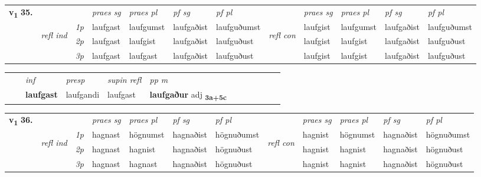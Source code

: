 \begin{tabular}{llllllllllll} \toprule
\multirow{4}{*}{{{\textbf{v{\textsubscript{1}}} \Large{\textbf{35.}}}}}  & &   &  \textit{praes sg}  & \textit{praes pl}  &\textit{pf sg} & \textit{pf pl} &  &  \textit{praes sg}  & \textit{praes pl}  & \textit{pf sg} & \textit{pf pl } \\*
	\cmidrule{4-7} \cmidrule{9-12}
 &\multirow{3}{*}{\begin{turn}{90}\textit{refl ind}\end{turn}} & {\textit{1p}} & laufgast & laufgumst    & laufgaðist & laufguðumst & \multirow{3}{*}{\begin{turn}{90}\textit{refl con}\end{turn}}  &laufgist & laufgumst & laufgaðist & laufguðumst\\*
 &&  {\textit{2p}} &  laufgast  & laufgist   & laufgaðist & laufguðust & &laufgist & laufgist & laufgaðist & laufguðust \\*
& &  {\textit{3p}} & laufgast & laufgast   & laufgaðist & laufguðust & & laufgist & laufgist& laufgaðist & laufguðust  \\*
\cmidrule{4-7} \cmidrule{9-12}
\end{tabular}


\begin{tabular}{llllllllllll}
 & & \textit{inf}     & \textit{presp}  & \textit{supin refl} & \textit{pp m}     \\*
  & & \textbf{laufgast}      & laufgandi  & laufgast & \textbf{laufgaður} adj \textbf{\textsubscript{3a+5c}} \\*
\cmidrule{1-12}
\end{tabular}



\begin{tabular}{llllllllllll} \toprule
\multirow{4}{*}{{{\textbf{v{\textsubscript{1}}} \Large{\textbf{36.}}}}}  & &   &  \textit{praes sg}  & \textit{praes pl}  &\textit{pf sg} & \textit{pf pl} &  &  \textit{praes sg}  & \textit{praes pl}  & \textit{pf sg} & \textit{pf pl } \\*
	\cmidrule{4-7} \cmidrule{9-12}
 &\multirow{3}{*}{\begin{turn}{90}\textit{refl ind}\end{turn}} & {\textit{1p}} & hagnast & högnumst    & hagnaðist & högnuðumst & \multirow{3}{*}{\begin{turn}{90}\textit{refl con}\end{turn}}  &hagnist & högnumst & hagnaðist & högnuðumst\\*
 &&  {\textit{2p}} &  hagnast  & hagnist   & hagnaðist & högnuðust & &hagnist & hagnist & hagnaðist & högnuðust \\*
& &  {\textit{3p}} & hagnast & hagnast   & hagnaðist & högnuðust & & hagnist & hagnist& hagnaðist & högnuðust  \\*
\cmidrule{4-7} \cmidrule{9-12}
\end{tabular}



